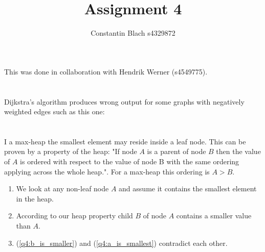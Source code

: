 \documentclass[12pt]{article}
\title {Assignment 4}
\author {Constantin Blach s4329872}
\begin{document}
\maketitle

This was done in collaboration with Hendrik Werner (s4549775).

\section{} %
\section{} %
\section{} %
Dijkstra's algorithm produces wrong output for some graphs with negatively weighted edges such as this one:


\section{} %
I a max-heap the smallest element may reside inside a leaf node. This can be proven by a property of the heap: "If node $A$ is a parent of node $B$ then the value of $A$ is ordered with respect to the value of node B with the same ordering applying across the whole heap.". For a max-heap this ordering is $A > B$.

\begin{enumerate}
	\item \label{q4:a_is_smallest}
	We look at any non-leaf node $A$ and assume it contains the smallest element in the heap.
	\item \label{q4:b_is_smaller}
	According to our heap property child $B$ of node $A$ contains a smaller value than $A$.
	\item
	(\ref{q4:b_is_smaller}) and (\ref{q4:a_is_smallest}) contradict each other.
\end{enumerate}
\end{document}
